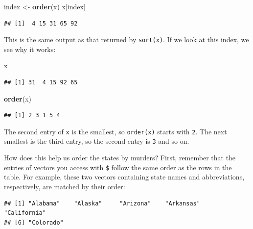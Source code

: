\documentclass[
]{article}
\newenvironment{Shaded}{\begin{snugshade}}{\end{snugshade}}
\newcommand{\DecValTok}[1]{\textcolor[rgb]{0.00,0.00,0.81}{#1}}
\newcommand{\FunctionTok}[1]{\textcolor[rgb]{0.13,0.29,0.53}{\textbf{#1}}}
\newcommand{\NormalTok}[1]{#1}
\newcommand{\OtherTok}[1]{\textcolor[rgb]{0.56,0.35,0.01}{#1}}
\newcommand{\SpecialCharTok}[1]{\textcolor[rgb]{0.81,0.36,0.00}{\textbf{#1}}}
\begin{document}
\begin{Shaded}
\begin{Highlighting}[]
\NormalTok{index }\OtherTok{\textless{}{-}} \FunctionTok{order}\NormalTok{(x)}
\NormalTok{x[index]}
\end{Highlighting}
\end{Shaded}

\begin{verbatim}
## [1]  4 15 31 65 92
\end{verbatim}

This is the same output as that returned by \texttt{sort(x)}. If we look
at this index, we see why it works:

\begin{Shaded}
\begin{Highlighting}[]
\NormalTok{x}
\end{Highlighting}
\end{Shaded}

\begin{verbatim}
## [1] 31  4 15 92 65
\end{verbatim}

\begin{Shaded}
\begin{Highlighting}[]
\FunctionTok{order}\NormalTok{(x)}
\end{Highlighting}
\end{Shaded}

\begin{verbatim}
## [1] 2 3 1 5 4
\end{verbatim}

The second entry of \texttt{x} is the smallest, so \texttt{order(x)}
starts with \texttt{2}. The next smallest is the third entry, so the
second entry is \texttt{3} and so on.

How does this help us order the states by murders? First, remember that
the entries of vectors you access with \texttt{\$} follow the same order
as the rows in the table. For example, these two vectors containing
state names and abbreviations, respectively, are matched by their order:

\begin{Shaded}
\end{Shaded}

\begin{verbatim}
## [1] "Alabama"    "Alaska"     "Arizona"    "Arkansas"   "California"
## [6] "Colorado"
\end{verbatim}
\end{document}
